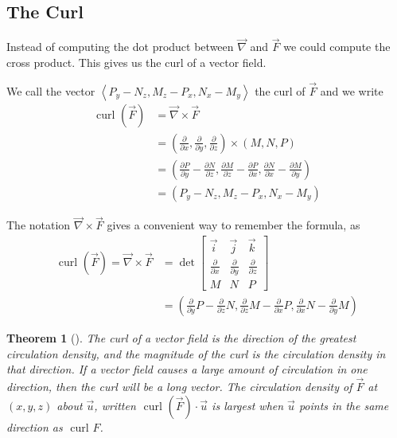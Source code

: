 \documentclass[10pt,]{book}
\theoremstyle{plain}
\newtheorem{theorem}{Theorem}[section]
\theoremstyle{definition}
\theoremstyle{definition}
\theoremstyle{definition}
\theoremstyle{definition}
\theoremstyle{definition}
\numberwithin{equation}{section}
\newcommand{\lt}{<}
\newcommand{\amp}{&}
\begin{document}
\typeout{************************************************}
\typeout{************************************************}
\subsection[{The Curl}]{The Curl}\label{subsection-65}
Instead of computing the dot product between \(\vec \nabla\) and \(\vec F\) we could compute the cross product. This gives us the curl of a vector field.%
\par
We call the vector \(\left\lt P_y-N_z,M_z-P_x,N_x-M_y\right>\) the curl of \(\vec F\) and we write%
\begin{align*}
\text{ curl } (\vec F) 
\amp = \vec \nabla \times \vec F\\
\amp = \left(\frac{\partial}{\partial x},\frac{\partial}{\partial y},\frac{\partial}{\partial z}\right) \times (M,N,P)\\
\amp = \left(\frac{\partial P}{\partial y}-\frac{\partial N}{\partial z}, \frac{\partial M}{\partial z}-\frac{\partial P}{\partial x},\frac{\partial N}{\partial x}-\frac{\partial M}{\partial y}\right)\\
\amp =  \left(P_y-N_z,M_z-P_x,N_x-M_y\right)
\end{align*}
%
\par
The notation \(\vec \nabla \times \vec F\) gives a convenient way to remember the formula, as%
\begin{align*}
\text{ curl } (\vec F)=\vec \nabla \times \vec F 
\amp =\det \begin{bmatrix}
\vec i \amp  \vec j \amp  \vec k\\
\frac{\partial}{\partial x}\amp \frac{\partial}{\partial y}\amp \frac{\partial}{\partial z}\\
M\amp N\amp P
\end{bmatrix}\\
\amp = \left(\frac{\partial}{\partial y}P-\frac{\partial}{\partial z}N,\frac{\partial}{\partial z}M-\frac{\partial}{\partial x}P,\frac{\partial}{\partial x}N-\frac{\partial}{\partial y}M\right)
\end{align*}
%
\begin{theorem}[{}]\label{theorem-13}
The curl of a vector field is the direction of the greatest circulation density, and the magnitude of the curl is the circulation density in that direction. If a vector field causes a large amount of circulation in one direction, then the curl will be a long vector. The circulation density of \(\vec F\) at \((x,y,z)\) about \(\vec u\), written \(\text{ curl } (\vec F)\cdot \vec u\) is largest when \(\vec u\) points in the same direction as \(\text{ curl }  F\).%
\end{theorem}
\end{document}
